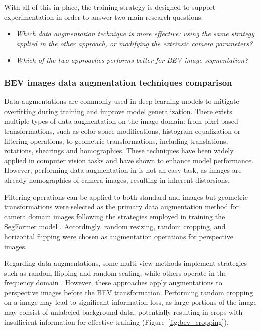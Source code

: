 With all of this in place, the training strategy is designed to support experimentation in order to answer two main research questions:

\begin{itemize}
    \item \textit{Which data augmentation technique is more effective: using the same strategy applied in the other approach, or modifying the extrinsic camera parameters?}
    \item \textit{Which of the two approaches performs better for BEV image segmentation?}
\end{itemize}

\subsubsection{BEV images data augmentation techniques comparison}
Data augmentations are commonly used in deep learning models to mitigate overfitting during training and improve model generalization. There exists multiple types of data augmentation on the image domain: from pixel-based transformations, such as color space modifications, histogram equalization or filtering operations; to geometric transformations, including translations, rotations, shearings and homographies. These techniques have been widely applied in computer vision tasks and have shown to enhance model performance. However, performing data augmentation in  is not an easy task, as  images are already homographies of camera images, resulting in inherent distorsions.

Filtering operations can be applied to both standard and  images but geometric transformations were selected as the primary data augmentation method for camera domain images following the strategies employed in training the SegFormer model \cite{segformer}. Accordingly, random resizing, random cropping, and horizontal flipping were chosen as augmentation operations for perspective images.

Regarding  data augmentations, some multi-view methods implement strategies such as random flipping and random scaling, while others operate in the frequency domain \cite{HSDA}. However, these approaches apply augmentations to perspective images before the BEV transformation. Performing random cropping on a  image may lead to significant information loss, as large portions of the image may consist of unlabeled background data, potentially resulting in crops with insufficient information for effective training (Figure~\ref{fig:bev_cropping}). 

